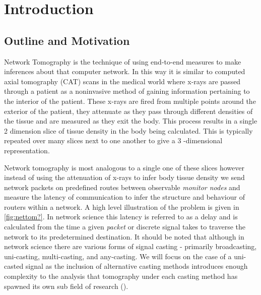 \chapter{Introduction}
\label{cha:intro}

\section{Outline and Motivation}
\label{sec:Imotivationandoutline}

Network Tomography is the technique of using end-to-end measures to make inferences about that computer network. In this way it is similar to computed axial tomography (CAT) scans in the medical world where x-rays are passed through a patient as a noninvasive method of gaining information pertaining to the interior of the patient. These x-rays are fired from multiple points around the exterior of the patient, they attenuate as they pass through different densities of the tissue and are measured as they exit the body. This process results in a single 2 dimension slice of tissue density in the body being calculated. This is typically repeated over many slices next to one another to give a 3 -dimensional representation.\par
Network tomography is most analogous to a single one of these slices however instead of using the attenuation of x-rays to infer body tissue density we send network packets on predefined routes between observable \textit{monitor nodes} and measure the latency of communication to infer the structure and behaviour of routers within a network. A high level illustration of the problem is given in \ref{fig:nettom?}. In network science this latency is referred to as a delay and is calculated from the time a given \textit{packet} or discrete signal takes to traverse the network to its predetermined destination. It should be noted that although in network science there are various forms of signal casting - primarily broadcasting, uni-casting, multi-casting, and any-casting. We will focus on the case of a uni-casted signal as the inclusion of alternative casting methods introduces enough complexity to the analysis that tomography under each casting method has spawned its own sub field of research (\cite{lawrence_network_2006}).\par
